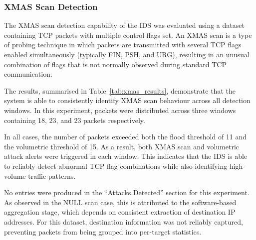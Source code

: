 \subsubsection{XMAS Scan Detection}

\begin{table}[H]
    \centering
    \caption{XMAS scan detection results}
    \label{tab:xmas_results}
\end{table}

The XMAS scan detection capability of the IDS was evaluated using a dataset
containing TCP packets with multiple control flags set. An XMAS scan is a type
of probing technique in which packets are transmitted with several TCP flags
enabled simultaneously (typically FIN, PSH, and URG), resulting in an unusual
combination of flags that is not normally observed during standard TCP
communication.

The results, summarised in Table~\ref{tab:xmas_results}, demonstrate that the
system is able to consistently identify XMAS scan behaviour across all
detection windows. In this experiment, packets were distributed across three
windows containing 18, 23, and 23 packets respectively.

In all cases, the number of packets exceeded both the flood threshold of 11 and
the volumetric threshold of 15. As a result, both XMAS scan and volumetric
attack alerts were triggered in each window. This indicates that the IDS is
able to reliably detect abnormal TCP flag combinations while also identifying
high-volume traffic patterns.

No entries were produced in the ``Attacks Detected'' section for this
experiment. As observed in the NULL scan case, this is attributed to the
software-based aggregation stage, which depends on consistent extraction of
destination IP addresses. For this dataset, destination information was not
reliably captured, preventing packets from being grouped into per-target
statistics.

